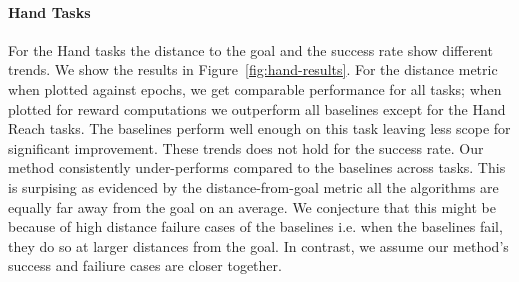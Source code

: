\paragraph{Hand Tasks}

For the Hand tasks the distance to the goal and the success rate show different trends.
We show the results in Figure~\ref{fig:hand-results}.
For the distance metric when plotted against epochs, we get comparable
performance for all tasks; when plotted for reward computations we outperform
all baselines except for the Hand Reach tasks. The baselines perform
well enough on this task leaving less scope for significant improvement.
These trends does not hold for the success rate. Our method
consistently under-performs compared to the baselines across tasks. This
is surpising as evidenced by the distance-from-goal metric all the
algorithms are equally far away from the goal on an average. We conjecture that this might be because of
high distance failure cases of the baselines i.e. when the baselines
fail, they do so at larger distances from the goal. In contrast, we
assume our method's success and failiure cases are closer together. 

